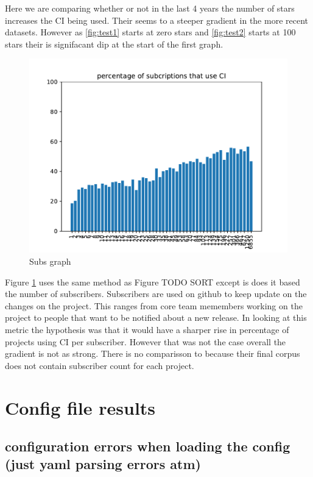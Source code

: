 \documentclass[twoside,12pt,titlepage,a4paper]{article}
\begin{document}
Here we are comparing whether or not in the last 4 years the number of stars increases the CI being used. Their seems to a steeper gradient in the more recent datasets. However as \ref{fig:test1} starts at zero stars and \ref{fig:test2} starts at 100 stars their is signifacant dip at the start of the first graph.

\begin{figure}[!h]
  \centering
  \includegraphics[width=.3\textwidth]{../src/results/percentage sub with CI.pdf}
  \caption{Subs graph}
  \label{graph_percentage_subs}
\end{figure}

Figure \ref{graph_percentage_subs} uses the same method as Figure TODO SORT except is does it based the number of subscribers. Subscribers are used on github to keep update on the changes on the project. This ranges from core team memembers working on the project to people that want to be notified about a new release. 
In looking at this metric the hypothesis was that it would have a sharper rise in percentage of projects using CI per subscriber. However that was not the case overall the gradient is not as strong. There is no comparisson to \cite{Hilton2016} because their final corpus does not contain subscriber count for each project.






\section{Config file results}

\vspace*{-0.05in}
\subsection{configuration errors when loading the config (just yaml parsing errors atm)}
\vspace*{-0.05in}
\end{document}
